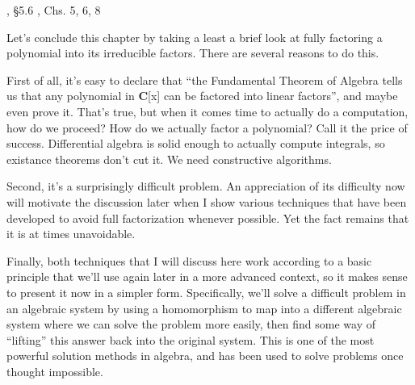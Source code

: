\begin{comment}
There is only one way to extend an ordered integral domain into an
ordered quotient field.

Next, we introduce real numbers individually as Cauchy sequences and
collectively as an extension field, ordered by showing that the
trailing terms in such a sequence must either converge to zero or
become uniformly positive or negative, establishing O1.  A little more
work is then needed to show that O2 and O3 hold, and that the
Archemedian property carries through.

Next, we show that square roots always exist, as Cauchy sequences, for
all positive numbers.  This requires constructing a sequence of larger
and larger numbers, each of which we square, invert, multiply by 2,
and use A1 to demand an even larger element of {\bf Q}.  Fill in the
details.  Might need Archmedian property for this.

Next, construct ${\bf C}$ by extending algebraically to adjoin $i$,
and use the prior result to demonstrate that square roots exist for
all numbers in ${\bf C}$.  Then introduce the modulus of a complex
number and establish that $|1+\gamma|\le 1+|\gamma|$.

\end{comment}

, \S5.6
\hbox{}\qquad [Geddes], Chs. 5, 6, 8

Let's conclude this chapter by taking a least a brief look at fully
factoring a polynomial into its irreducible factors.  There are
several reasons to do this.

First of all, it's easy to declare that ``the Fundamental Theorem of
Algebra tells us that any polynomial in {\bf C}[x] can be factored
into linear factors'', and maybe even prove it.  That's true, but when it comes
time to actually do a computation, how do we proceed?  How do we
actually factor a polynomial?  Call it the price of success.
Differential algebra is solid enough to actually compute integrals, so
existance theorems don't cut it.  We need constructive algorithms.

Second, it's a surprisingly difficult problem.  An appreciation of its
difficulty now will motivate the discussion later when I show various
techniques that have been developed to avoid full factorization
whenever possible.  Yet the fact remains that it is at times
unavoidable.

Finally, both techniques that I will discuss here work according to a
basic principle that we'll use again later in a more advanced context,
so it makes sense to present it now in a simpler form.  Specifically,
we'll solve a difficult problem in an algebraic system by using a
homomorphism to map into a different algebraic system where we can
solve the problem more easily, then find some way of ``lifting'' this
answer back into the original system.  This is one of the most
powerful solution methods in algebra, and has been used to solve
problems once thought impossible.

